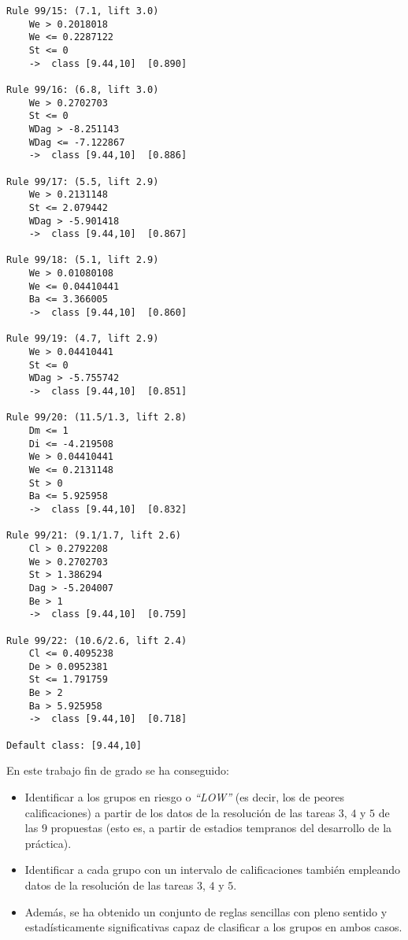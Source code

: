 \begin{tcolorbox}[title=Reglas de clasificación para identificar intervalos de notas.]
\begin{multicols}{3}
\begin{verbatim}
Rule 99/15: (7.1, lift 3.0)
	We > 0.2018018
	We <= 0.2287122
	St <= 0
	->  class [9.44,10]  [0.890]

Rule 99/16: (6.8, lift 3.0)
	We > 0.2702703
	St <= 0
	WDag > -8.251143
	WDag <= -7.122867
	->  class [9.44,10]  [0.886]

Rule 99/17: (5.5, lift 2.9)
	We > 0.2131148
	St <= 2.079442
	WDag > -5.901418
	->  class [9.44,10]  [0.867]

Rule 99/18: (5.1, lift 2.9)
	We > 0.01080108
	We <= 0.04410441
	Ba <= 3.366005
	->  class [9.44,10]  [0.860]

Rule 99/19: (4.7, lift 2.9)
	We > 0.04410441
	St <= 0
	WDag > -5.755742
	->  class [9.44,10]  [0.851]

Rule 99/20: (11.5/1.3, lift 2.8)
	Dm <= 1
	Di <= -4.219508
	We > 0.04410441
	We <= 0.2131148
	St > 0
	Ba <= 5.925958
	->  class [9.44,10]  [0.832]

Rule 99/21: (9.1/1.7, lift 2.6)
	Cl > 0.2792208
	We > 0.2702703
	St > 1.386294
	Dag > -5.204007
	Be > 1
	->  class [9.44,10]  [0.759]

Rule 99/22: (10.6/2.6, lift 2.4)
	Cl <= 0.4095238
	De > 0.0952381
	St <= 1.791759
	Be > 2
	Ba > 5.925958
	->  class [9.44,10]  [0.718]

Default class: [9.44,10]
    \end{verbatim}
  \end{multicols}
\end{tcolorbox}

\begin{tcolorbox}[colframe=blue!80, title=Resumen de los resultados obtenidos]
En este trabajo fin de grado se ha conseguido:
\begin{itemize}
\item Identificar a los grupos en riesgo o \emph{``LOW''} (es decir, los de peores calificaciones) a partir de los datos de la resolución de las tareas $3$, $4$ y $5$ de las $9$ propuestas (esto es, a partir de estadios tempranos del desarrollo de la práctica).
\item Identificar a cada grupo con un intervalo de calificaciones también empleando datos de la resolución de las tareas $3$, $4$ y $5$.
\item Además, se ha obtenido un conjunto de reglas sencillas con pleno sentido y estadísticamente significativas capaz de clasificar a los grupos en ambos casos.
\end{itemize}
\end{tcolorbox}